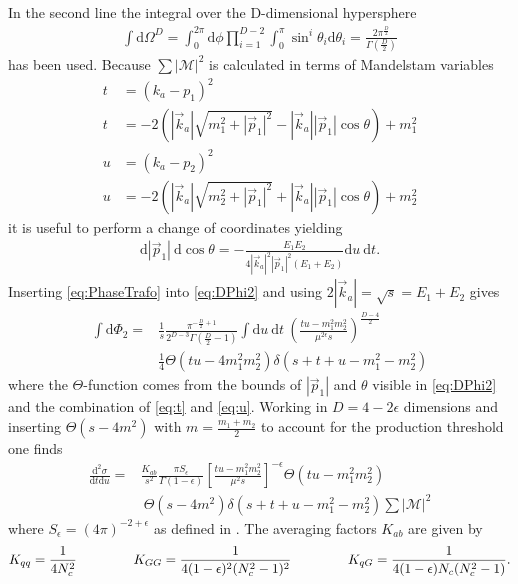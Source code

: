 In the second line the integral over the D-dimensional hypersphere 
\begin{align}
\int \mathrm{d}\Omega^D = \int_0^{2\pi} \mathrm{d}\phi \prod_{i=1}^{D-2}\int_0^\pi \sin^i\theta_i \mathrm{d}\theta_i = \frac{2\pi^{\frac{D}{2}}}{\Gamma(\frac{D}{2})}
\end{align}
has been used. Because $\sum|\mathcal{M}|^2$ is calculated in terms of Mandelstam variables 
\begin{align}
t &= (k_a-p_1)^2  \nonumber\\
t &= -2\left(|\vec{k}_a| \sqrt{m_1^2 + |\vec{p}_1|^2} - |\vec{k}_a||\vec{p}_1| \cos\theta\right) + m_1^2\label{eq:t} \\
u &= (k_a-p_2)^2\nonumber\\
u &= -2\left(|\vec{k}_a| \sqrt{m_2^2 + |\vec{p}_1|^2} + |\vec{k}_a||\vec{p}_1| \cos\theta\right) + m_2^2\label{eq:u}
\end{align}
it is useful to perform a change of coordinates yielding
\begin{align}
\mathrm{d}|\vec{p}_1|\ \mathrm{d}\cos\theta = -\frac{E_1 E_2}{4|\vec{k}_a|^2|\vec{p}_1|^2(E_1+E_2)}\mathrm{d}u\ \mathrm{d}t.\label{eq:PhaseTrafo}
\end{align}
Inserting \ref{eq:PhaseTrafo} into \ref{eq:DPhi2} and using $2|\vec{k}_a| = \sqrt{s} = E_1 + E_2$ gives
\begin{align}
\int \mathrm{d}\Phi_2 = & \frac{1}{s} \frac{\pi^{-\frac{D}{2}+1}}{2^{D-3}\Gamma(\frac{D}{2}-1)} \int \mathrm{d}u\ \mathrm{d}t\ \left( \frac{tu-m_1^2m_2^2}{\mu^{2\epsilon} s} \right)^{\frac{D-4}{2}} \nonumber\\
&\frac{1}{4}\Theta(tu-4m_1^2m_2^2)\delta \left(s+t+u-m_1^2-m_2^2\right)
\end{align}
where the $\Theta$-function comes from the bounds of $|\vec{p}_1|$ and $\theta$ visible in \ref{eq:DPhi2} and the combination of \ref{eq:t} and \ref{eq:u}. Working in $D=4-2\epsilon$ dimensions and inserting $\Theta(s-4m^2)$ with $m = \frac{m_1 + m_2}{2}$ to account for the production threshold one finds
\begin{align}
\frac{\mbox{d}^2 \sigma}{\mbox{d}t\mbox{d}u} =& \frac{K_{ab}}{s^2} \frac{\pi S_{\epsilon}}{\Gamma(1-\epsilon)} \left[ \frac{tu-m_1^2m_2^2}{\mu^2 s}\right]^{-\epsilon} \Theta(tu-m_1^2m_2^2)\nonumber\\
&\ \Theta(s-4m^2) \delta(s+t+u-m_1^2-m_2^2) \sum |\mathcal{M}|^2
\end{align}
where $S_\epsilon = (4\pi)^{-2+\epsilon}$ as defined in \cite{Beenakker:1996ch}.
The averaging factors $K_{ab}$ are given by
\begin{align}
K_{qq} = \frac{1}{4N_c^2} \hspace{1.5cm}K_{GG} = \frac{1}{4(1-\epsilon)^2(N_c^2-1)^2} \hspace{1.5cm}K_{qG} = \frac{1}{4(1-\epsilon)N_c(N_c^2-1)}.
\end{align}

